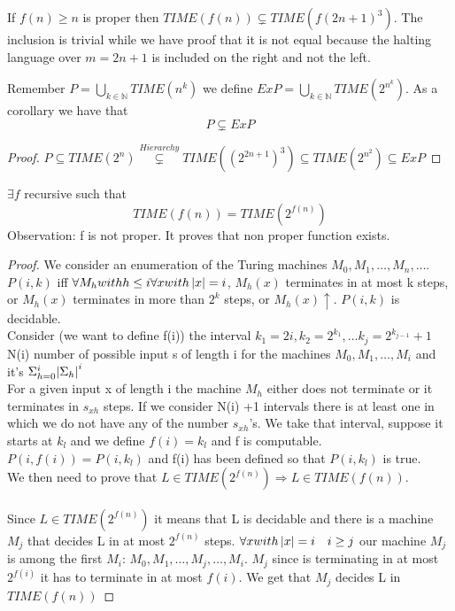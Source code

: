 \begin{theorem}[Hierarchy]
    If $f(n)\geq n$ is proper then $TIME(f(n)) \subsetneq TIME(f(2n+1)^3)$. The inclusion is trivial while we have proof that it is not equal because the halting language over $m = 2n+1$ is included on the right and not the left. 
\end{theorem}
Remember $P = \bigcup_{k\in \mathbb{N}}{TIME(n^k)}$ we define $ExP = \bigcup_{k\in \mathbb{N}}{TIME(2^{n^k})}$. As a corollary we have that \[ 
    P \subsetneq ExP 
\]
\begin{proof}
    $P\subseteq TIME(2^n) \overset{Hierarchy}{\subsetneq} TIME((2^{2n+1})^3) \subseteq TIME(2^{n^2}) \subseteq ExP$
\end{proof}
\begin{theorem}
    $\exists f$ recursive such that 
    \[ 
        TIME(f(n)) = TIME(2^{f(n)}) 
    \]Observation: f is not proper. It proves that non proper function exists.\\
    \begin{proof}
        We consider an enumeration of the Turing machines $M_{0},M_{1}, \ldots,M_{n},\ldots$.\\
        $P(i,k)$ iff $\forall M_h with h\leq i \forall x with \left\lvert x\right\rvert=i$, $M_h(x)$ terminates in at most k steps, or $M_h(x)$ terminates in more than $2^k$ steps, or $M_h(x) \uparrow$. $P(i,k)$ is decidable.\\
        Consider (we want to define f(i)) the interval $k_1 = 2i, k_2 = 2^{k_1}, \ldots k_j = 2^{k_{j-1}}+1$
        N(i) number of possible input s of length i for the machines $M_0, M_1, \ldots, M_i$ and it's $\Sigma_{h=0}^{i}{\left\lvert\Sigma_h\right\rvert^i}$\\
        For a given input x of length i the machine $M_h$ either does not terminate or it terminates in $s_{xh}$ steps. If we consider N(i) +1 intervals there is at least one in which we do not have any of the number $s_{xh}$'s. We take that interval, suppose it starts at $k_l$ and we define $f(i)=k_l$ and f is computable. $P(i,f(i))= P(i,k_l)$ and f(i) has been defined so that $P(i,k_l)$ is true.\\
        We then need to prove that $L \in TIME(2^{f(n)}) \Rightarrow L \in TIME(f(n))$.\\\\
        Since $L\in TIME(2^{f(n)})$ it means that L is decidable and there is a machine $M_j$ that decides L in at most $2^{f(n)}$ steps. $\forall x with \left\lvert x\right\rvert= i \quad i\geq j$ our machine $M_j$ is among the first $M_i$: $M_0, M_1, \ldots, M_j, \ldots, M_i$. $M_j$ since is terminating in at most $2^{f(i)}$ it has to terminate in at most $f(i)$. We get that $M_j$ decides L in $TIME(f(n))$
    \end{proof}
\end{theorem}

